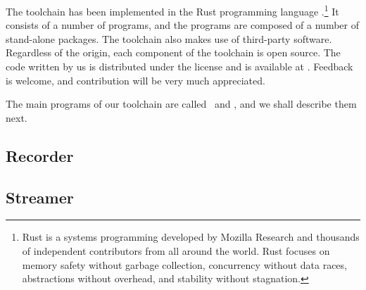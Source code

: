 The toolchain has been implemented in the Rust programming language
\cite{rust}.\footnote{Rust is a systems programming developed by Mozilla
Research and thousands of independent contributors from all around the world.
Rust focuses on memory safety without garbage collection, concurrency without
data races, abstractions without overhead, and stability without stagnation.} It
consists of a number of programs, and the programs are composed of a number of
stand-alone packages. The toolchain also makes use of third-party software.
Regardless of the origin, each component of the toolchain is open source. The
code written by us is distributed under the  license \cite{mit} and is
available at \cite{sources}. Feedback is welcome, and contribution will be very
much appreciated.

The main programs of our toolchain are called \recorder\ and \streamer, and we
shall describe them next.

\subsection{Recorder}


\subsection{Streamer}
